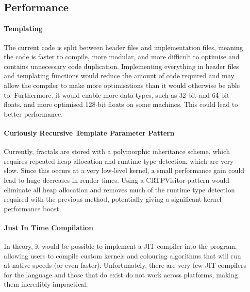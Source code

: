 \subsection{Performance}

\paragraph{Templating} The current code is split between header files and implementation files, meaning the code is faster to compile, more modular, and more difficult to optimise and contains unnecessary code duplication. Implementing everything in header files and templating functions would reduce the amount of code required and may allow the compiler to make more optimisations than it would otherwise be able to. Furthermore, it would enable more data types, such as 32-bit and 64-bit floats, and more optimised 128-bit floats on some machines. This could lead to better performance.

\paragraph{Curiously Recursive Template Parameter Pattern} Currently, fractals are stored with a polymorphic inheritance scheme, which requires repeated heap allocation and runtime type detection, which are very slow. Since this occurs at a very low-level kernel, a small performance gain could lead to huge decreases in render times. Using a CRTPVisitor pattern would eliminate all heap allocation and removes much of the runtime type detection required with the previous method, potentially giving a significant kernel performance boost.

\paragraph{Just In Time Compilation} In theory, it would be possible to implement a JIT compiler into the program, allowing users to compile custom kernels and colouring algorithms that will run at native speeds (or even faster). Unfortunately, there are very few JIT compilers for the \CPP language and those that do exist do not work across platforms, making them incredibly impractical.
